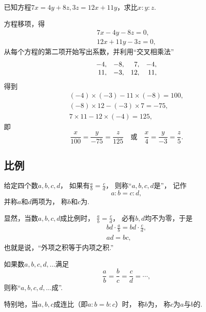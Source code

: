 \begin{example}
已知方程\(7x=4y+8z, 3z=12x+11y\)，求比\(x:y:z\).
\begin{solution}
方程移项，得\begin{gather*}
	7x-4y-8z=0, \\
	12x+11y-3z=0,
\end{gather*}
从每个方程的第二项开始写出系数，并利用“交叉相乘法”
\begin{equation*}
	\begin{array}{*4r}
		-4, & -8, & 7, & -4, \\
		11, & -3, & 12, & 11,
	\end{array}
\end{equation*}
得到\begin{gather*}
	(-4)\times(-3)-11\times(-8)=100, \\
	(-8)\times12-(-3)\times7=-75, \\
	7\times11-12\times(-4)=125,
\end{gather*}
即\begin{equation*}
	\frac{x}{100}=\frac{y}{-75}=\frac{z}{125}
	\quad\text{或}\quad
	\frac{x}{4}=\frac{y}{-3}=\frac{z}{5}.
\end{equation*}
\end{solution}
\end{example}

\subsection{比例}
\begin{definition}
给定四个数\(a,b,c,d\)，
如果有\(\frac{a}{b}=\frac{c}{d}\)，
则称“\(a,b,c,d\)是”，
记作\begin{equation*}
	a:b = c:d,
\end{equation*}
并称\(a\)和\(d\)两项为，
称\(b\)和\(c\)为.
\end{definition}

显然，当数\(a,b,c,d\)成比例时，
\(\frac{a}{b}=\frac{c}{d}\)，
必有\(b,d\)均不为零，于是\begin{gather*}
	bd \cdot \frac{a}{b} = bd \cdot \frac{c}{d}, \\
	ad = bc,
\end{gather*}
也就是说，“外项之积等于内项之积.”

\begin{definition}
如果数\(a,b,c,d,\dotsc\)满足\begin{equation*}
	\frac{a}{b} = \frac{b}{c} = \frac{c}{d} = \dotsb,
\end{equation*}
则称“\(a,b,c,d,\dotsc\)成”.

特别地，当\(a,b,c\)成连比（即\(a:b = b:c\)）时，
称\(b\)为，
称\(c\)为\(a\)与\(b\)的.
\end{definition}

